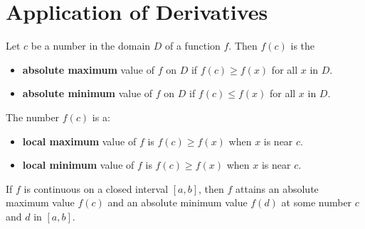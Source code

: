 \chapter{Application of Derivatives}

        \par Let $c$ be a number in the domain $D$ of a function $f$. Then $f(c)$ is the
        \begin{itemize}
            \item \textbf{absolute maximum} value of $f$ on $D$ if $f(c) \geq f(x)$ for all $x$
                in $D$.
            \item \textbf{absolute minimum} value of $f$ on $D$ if $f(c) \leq f(x)$ for all $x$
                in $D$.
        \end{itemize}

        \par The number $f(c)$ is a:
        \begin{itemize}
            \item \textbf{local maximum} value of $f$ is $f(c) \geq f(x)$ when $x$ is near $c$.
            \item \textbf{local minimum} value of $f$ is $f(c) \geq f(x)$ when $x$ is near $c$.
        \end{itemize}

        \par If $f$ is continuous on a closed interval $[a, b]$, then $f$ attains an
        absolute maximum value $f(c)$ and an absolute minimum value $f(d)$ at some
        number $c$ and $d$ in $[a, b]$. \footnotemark

